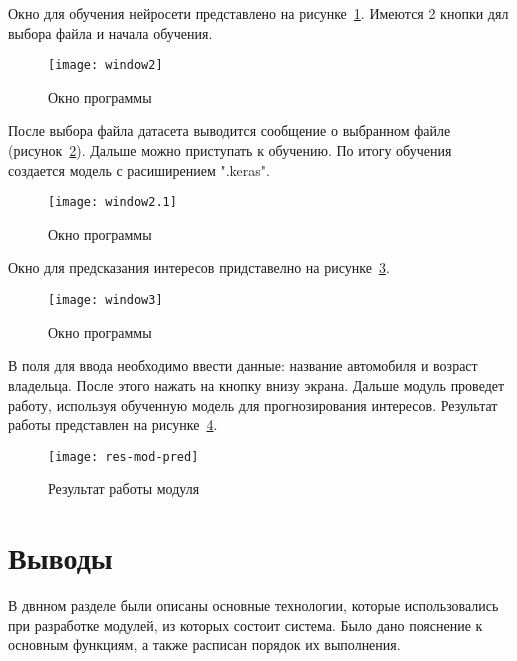 \newpage
Окно для обучения нейросети представлено на рисунке~\ref{f:window2}. Имеются 2 кнопки дял выбора файла и начала обучения.

\begin{figure}[h!]
	\centering
    \vspace{\toppaddingoffigure}
	\texttt{[image: window2]}
	\caption{Окно программы}
	\label{f:window2}
\end{figure}

После выбора файла датасета выводится сообщение о выбранном файле (рисунок~\ref{f:window2.1}). Дальше можно приступать к обучению. По итогу обучения создается модель с расиширением ".keras".

\begin{figure}[h!]
	\centering
    \vspace{\toppaddingoffigure}
	\texttt{[image: window2.1]}
	\caption{Окно программы}
	\label{f:window2.1}
\end{figure}

\newpage
Окно для предсказания интересов придставелно на рисунке~\ref{f:window3}.
\begin{figure}[h!]
	\centering
    \vspace{\toppaddingoffigure}
	\texttt{[image: window3]}
	\caption{Окно программы}
	\label{f:window3}
\end{figure}

В поля для ввода необходимо ввести данные: название автомобиля и возраст владельца. После этого нажать на кнопку внизу экрана. Дальше модуль проведет работу, используя обученную модель для прогнозирования интересов. Результат работы представлен на рисунке~\ref{f:res-mod-pred}.
\begin{figure}[h!]
	\centering
    \vspace{\toppaddingoffigure}
	\texttt{[image: res-mod-pred]}
	\caption{Результат работы модуля}
	\label{f:res-mod-pred}
\end{figure}




\newpage
\section*{Выводы}
В двнном разделе были описаны основные технологии, которые использовались при разработке модулей, из которых состоит система. Было дано пояснение к основным функциям, а также расписан порядок их выполнения.